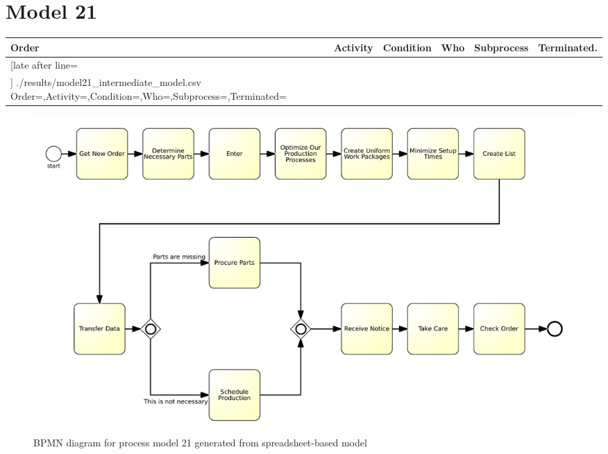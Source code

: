 \section{Model 21}
\begin{tcolorbox}[
	breakable,
	arc=0mm,
	left=1pt,
	right = 1pt,
	boxrule=0mm,
	colback = {white},
	]
	\texttt{}
\end{tcolorbox}
\label{txt:model21}

{\scriptsize
	\begin{longtable}{|p{0.03 \hsize}|p{0.25 \hsize}|p{0.15 \hsize}|p{0.2 \hsize}|p{0.1 \hsize}|p{0.1 \hsize}|}
		\hline
		Order & Activity & Condition & Who & Subprocess & Terminated.
		\\\hline\hline
		\csvreader[late after line=\\\hline]
		{./results/model21_intermediate_model.csv}
		{Order=\Order,Activity=\Activity,Condition=\Condition,Who=\Who,Subprocess=\Subprocess,Terminated=\Terminated}
		{\Order & \Activity & \Condition & \Who & \Subprocess & \Terminated}
		\caption{Spreadsheet-based description for process model 21}
		\label{csv:model21}
	\end{longtable}
}

\begin{figure}[H]
	\centering
	\includegraphics[width=\hsize]{./generated_bpmn/model21.pdf}
	\caption{BPMN diagram for process model 21 generated from spreadsheet-based model}
	\label{bpmn:generated_model21}
\end{figure}

